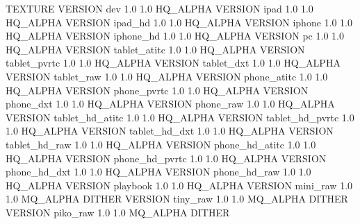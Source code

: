 TEXTURE
{
	VERSION dev			1.0 1.0		HQ_ALPHA
	VERSION ipad		1.0 1.0 	HQ_ALPHA
	VERSION ipad_hd		1.0 1.0 	HQ_ALPHA
	VERSION iphone 		1.0 1.0 	HQ_ALPHA
	VERSION iphone_hd	1.0 1.0		HQ_ALPHA
	VERSION pc 			1.0 1.0 	HQ_ALPHA
	VERSION tablet_atitc	1.0	1.0	HQ_ALPHA
	VERSION tablet_pvrtc	1.0	1.0	HQ_ALPHA
	VERSION tablet_dxt		1.0	1.0	HQ_ALPHA
	VERSION tablet_raw		1.0	1.0	HQ_ALPHA
	VERSION phone_atitc		1.0	1.0	HQ_ALPHA
	VERSION phone_pvrtc		1.0	1.0	HQ_ALPHA
	VERSION phone_dxt		1.0	1.0	HQ_ALPHA
	VERSION phone_raw		1.0	1.0	HQ_ALPHA
	VERSION tablet_hd_atitc	1.0	1.0	HQ_ALPHA
	VERSION tablet_hd_pvrtc	1.0	1.0	HQ_ALPHA
	VERSION tablet_hd_dxt	1.0	1.0	HQ_ALPHA
	VERSION tablet_hd_raw	1.0	1.0	HQ_ALPHA
	VERSION phone_hd_atitc	1.0	1.0	HQ_ALPHA
	VERSION phone_hd_pvrtc	1.0	1.0	HQ_ALPHA
	VERSION phone_hd_dxt	1.0	1.0	HQ_ALPHA
	VERSION phone_hd_raw	1.0	1.0	HQ_ALPHA
	VERSION playbook		1.0 1.0 HQ_ALPHA
	VERSION mini_raw		1.0 1.0	MQ_ALPHA DITHER
	VERSION tiny_raw		1.0 1.0	MQ_ALPHA DITHER
	VERSION piko_raw		1.0 1.0	MQ_ALPHA DITHER
}
